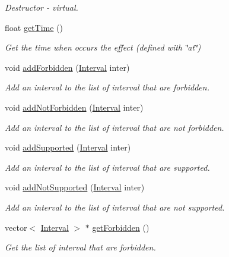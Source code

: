 \begin{DoxyCompactItemize}
\begin{DoxyCompactList}\small\item\em Destructor -\/ virtual. \end{DoxyCompactList}\item 
float \hyperlink{classAttribute_a06d82c170f9a71a4f3925467bcebc824}{get\+Time} ()
\begin{DoxyCompactList}\small\item\em Get the time when occurs the effect (defined with \char`\"{}at\char`\"{}) \end{DoxyCompactList}\item 
void \hyperlink{classAttribute_a14e5f87736aa3520b65fea9867f8faae}{add\+Forbidden} (\hyperlink{classInterval}{Interval} inter)
\begin{DoxyCompactList}\small\item\em Add an interval to the list of interval that are forbidden. \end{DoxyCompactList}\item 
void \hyperlink{classAttribute_a69f34ccca3ff1bb0bb747f869a9b90c6}{add\+Not\+Forbidden} (\hyperlink{classInterval}{Interval} inter)
\begin{DoxyCompactList}\small\item\em Add an interval to the list of interval that are not forbidden. \end{DoxyCompactList}\item 
void \hyperlink{classAttribute_ac4d46fd050a7d9f49eacf697a8f19cb9}{add\+Supported} (\hyperlink{classInterval}{Interval} inter)
\begin{DoxyCompactList}\small\item\em Add an interval to the list of interval that are supported. \end{DoxyCompactList}\item 
void \hyperlink{classAttribute_a285e7380f22708b78c187762319c267b}{add\+Not\+Supported} (\hyperlink{classInterval}{Interval} inter)
\begin{DoxyCompactList}\small\item\em Add an interval to the list of interval that are not supported. \end{DoxyCompactList}\item 
vector$<$ \hyperlink{classInterval}{Interval} $>$ $\ast$ \hyperlink{classAttribute_a22bfaccb31429589929a36244403456e}{get\+Forbidden} ()
\begin{DoxyCompactList}\small\item\em Get the list of interval that are forbidden. \end{DoxyCompactList}\item 

\end{DoxyCompactItemize}

